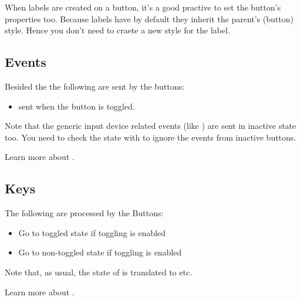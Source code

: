 \documentclass[letterpaper,10pt,english]{sphinxmanual}
\begin{document}
When labels are created on a button, it’s a good practive to set the button’s  properties too. Because labels have  by default they inherit the parent’s (button) style.
Hence you don’t need to craete a new style for the label.


\subsection{Events}
\label{\detokenize{object-types/btn:events}}
Besided the  the following  are sent by the buttons:
\begin{itemize}
\item {} 
 sent when the button is toggled.

\end{itemize}

Note that the generic input device related events (like ) are sent in inactive state too. You need to check the state with  to ignore the events from inactive buttons.

Learn more about {\hyperref[\detokenize{overview/events::doc}]{}}.


\subsection{Keys}
\label{\detokenize{object-types/btn:keys}}
The following  are processed by the Buttons:
\begin{itemize}
\item {} 
 Go to toggled state if toggling is enabled

\item {} 
 Go to non-toggled state if toggling is  enabled

\end{itemize}

Note that, as usual, the state of  is translated to  etc.

Learn more about {\hyperref[\detokenize{overview/indev::doc}]{}}.
\end{document}
